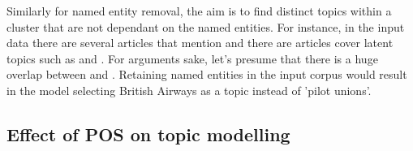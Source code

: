 Similarly for named entity removal, the aim is to find distinct topics within a cluster that are not dependant on the named entities. For instance, in the input data there are several articles that mention  and there are articles cover latent topics such as  and . For arguments sake, let's presume that there is a huge overlap between  and . Retaining named entities in the input corpus would result in  the model selecting British Airways as a topic instead of 'pilot unions'. 

\subsection{Effect of POS on topic modelling} \label{s:pos_topic}

